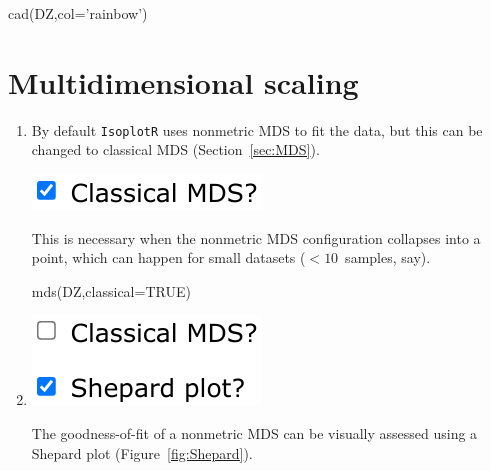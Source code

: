 \begin{refsection}
\begin{console}
cad(DZ,col='rainbow')
\end{console}

\section{Multidimensional scaling}

\begin{enumerate}

\item By default \texttt{IsoplotR} uses nonmetric MDS to fit the data,
  but this can be changed to classical MDS (Section~\ref{sec:MDS}).
  
  \noindent\begin{minipage}[t]{.18\linewidth}
\strut\vspace*{-\baselineskip}\newline
\includegraphics[width=\linewidth]{../figures/detritalMDSclassical.png}
\end{minipage}
\begin{minipage}[t]{.82\linewidth}
This is necessary when the nonmetric MDS configuration collapses into
a point, which can happen for small datasets ($< 10$~samples, say).
\end{minipage}

\begin{console}
mds(DZ,classical=TRUE)
\end{console}

\item\noindent\begin{minipage}[t]{.18\linewidth}
\strut\vspace*{-\baselineskip}\newline
\includegraphics[width=\linewidth]{../figures/detritalMDSshepard.png}
\end{minipage}
\begin{minipage}[t]{.82\linewidth}
The goodness-of-fit of a nonmetric MDS can be visually assessed using
a Shepard plot (Figure~\ref{fig:Shepard}).
\end{minipage}


\end{enumerate}
\end{refsection}

